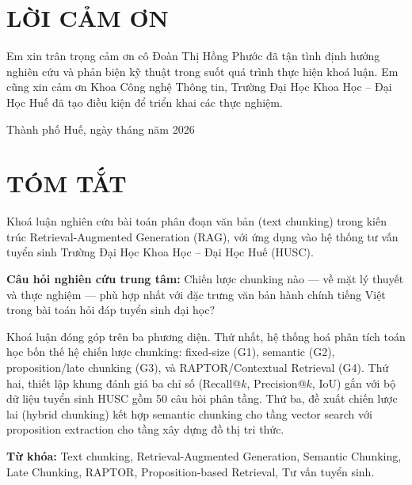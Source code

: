 \documentclass[12pt,a4paper]{report}
\theoremstyle{plain}
\theoremstyle{definition}
\begin{document}
	\thispagestyle{empty}
	\vspace*{3cm}
	\section*{LỜI CẢM ƠN}
	
	Em xin trân trọng cảm ơn cô Đoàn Thị Hồng Phước đã tận tình định hướng
	nghiên cứu và phản biện kỹ thuật trong suốt quá trình thực hiện khoá luận.
	Em cũng xin cảm ơn Khoa Công nghệ Thông tin, Trường Đại Học Khoa Học --
	Đại Học Huế đã tạo điều kiện để triển khai các thực nghiệm.
	
	\vspace{2cm}
	\begin{flushright}
		Thành phố Huế, ngày \quad tháng \quad năm 2026
	\end{flushright}
	\clearpage
	
	\thispagestyle{empty}
	\vspace*{2cm}
	\section*{TÓM TẮT}
	
	Khoá luận nghiên cứu bài toán phân đoạn văn bản (text chunking) trong kiến
	trúc Retrieval-Augmented Generation (RAG), với ứng dụng vào hệ thống tư vấn
	tuyển sinh Trường Đại Học Khoa Học -- Đại Học Huế (HUSC).
	
	\textbf{Câu hỏi nghiên cứu trung tâm:} Chiến lược chunking nào --- về mặt
	lý thuyết và thực nghiệm --- phù hợp nhất với đặc trưng văn bản hành chính
	tiếng Việt trong bài toán hỏi đáp tuyển sinh đại học?
	
	Khoá luận đóng góp trên ba phương diện. Thứ nhất, hệ thống hoá phân tích
	toán học bốn thế hệ chiến lược chunking: fixed-size (G1), semantic (G2),
	proposition/late chunking (G3), và RAPTOR/Contextual Retrieval (G4). Thứ
	hai, thiết lập khung đánh giá ba chỉ số (Recall@$k$, Precision@$k$, IoU)
	gắn với bộ dữ liệu tuyển sinh HUSC gồm 50 câu hỏi phân tầng. Thứ ba, đề
	xuất chiến lược lai (hybrid chunking) kết hợp semantic chunking cho tầng
	vector search với proposition extraction cho tầng xây dựng đồ thị tri thức.
	
	\textbf{Từ khóa:} Text chunking, Retrieval-Augmented Generation, Semantic
	Chunking, Late Chunking, RAPTOR, Proposition-based Retrieval, Tư vấn tuyển sinh.
	
\end{document}
